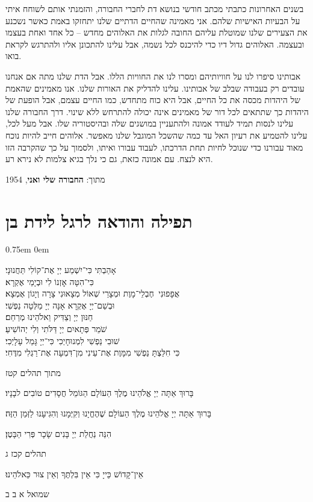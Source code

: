 \documentclass[14pt, article, extrafontsizes, twopage, a4paper]{memoir}
\newcommand{\attr}[1]{
{\raggedright\smaller#1}
}
\begin{document}
בשנים האחרונות כתבתי מכתב חודשי בנושא דת לחברי החבורה, והזמנתי אותם לשוחח איתי על הבעיות האישיות שלהם. אני מאמינה שהחיים הדתיים שלנו יתחזקו באמת כאשר נשכנע את הצעירים שלנו שמוטלת עליהם החובה לגלות את האלוהים מחדש – כל אחד ואחת בעצמו ובעצמה. האלוהים גדול דיו כדי להיכנס לכל נשמה, אבל עלינו להתכונן אליו ולהתרגש לקראת בואו.

אבותינו סיפרו לנו על חוויותיהם ומסרו לנו את החוויות הללו. אבל הדת שלנו מתה אם אנחנו עובדים רק בעבודה שבלב של אבותינו. עלינו להדליק את האורות שלנו. אנו מאמינים שהאמת של היהדות מכסה את כל החיים, אבל היא כוח מתחדש, כמו החיים עצמם, אבל הופעת של היהדות כך שתתאים לכל דור של מאמינים אינה יכולה להתרחש ללא שינוי. דרך החבורה שלנו עלינו לנסות תמיד לעודד אמונה ולהתעניין במושגים שלה ובהיסטוריה שלו. אבל מעל לכל, עלינו להטמיע את רעיון האל עד כמה שהשכל המוגבל שלנו מאפשר. אלוהים חייב להיות נוכח מאוד עבורנו כדי שנוכל לחיות תחת הדרכתו, לעבוד עבורו ואיתו, ולסמוך על כך שהקרבה הזו היא לנצח. עם אמונה כזאת, גם כי נלך בגיא צלמות לא נירא רע.

\attr{מתוך: \textbf{החבורה שלי ואני}, 1954}


\pagebreak
\chapter{תפילה והודאה לרגל לידת בן}
\parskip 0.75em
\parindent 0em


אָהַבְתִּי כִּי־יִשְׁמַע יְיָ אֶת־קוֹלִי תַּחֲנוּנָי׃\\
כִּי־הִטָּה אׇזְנוֹ לִי וּבְיָמַי אֶקְרָא׃\\
אֲפָפוּנִי  חֶבְלֵי־מָוֶת וּמְצָרֵי שְׁאוֹל מְצָאוּנִי צָרָה וְיָגוֹן אֶמְצָא׃\\
וּבְשֵׁם־יְיָ אֶקְרָא אָנָּה יְיָ מַלְּטָה נַפְשִׁי׃\\
חַנּוּן יְיָ וְצַדִּיק וֵאלֹהֵינוּ מְרַחֵם׃\\
שֹׁמֵר פְּתָאיִם יְיָ דַּלֹּתִי וְלִי יְהוֹשִׁיעַ׃\\
שׁוּבִי נַפְשִׁי לִמְנוּחָיְכִי כִּי־יְיָ גָּמַל עָלָיְכִי׃\\
כִּי חִלַּצְתָּ נַפְשִׁי מִמָּוֶת אֶת־עֵינִי מִן־דִּמְעָה אֶת־רַגְלִי מִדֶּחִי׃
\attr{מתוך תהלים קטז}

בָּרוּךְ אַתָּה יְיָ אֱלֹהֵינוּ מֶלֶךְ הַעוֹלָם הַגּוֹמֵל חֲסָדִים טוֹבִים לבָנָיו׃

בָּרוּךְ אַתָּה יְיָ אֱלֹהֵינוּ מֶלֶךְ הַעוֹלָם שֶׁהֶחֱיָנוּ וְקִיְּמָנוּ וְהִגִּיעָנוּ לַזְּמַן הַזֶּה׃

הִנֵּה נַחֲלַת יְיָ בָּנִים שָׂכָר פְּרִי הַבָּטֶן׃
\attr{תהלים קכז ג}

אֵין־קָדוֹשׁ כַּייָ כִּי אֵין בִּלְתֶּךָ וְאֵין צוּר כֵּאלֹהֵינוּ׃
\attr{שמואל א ב ב}
\end{document}
